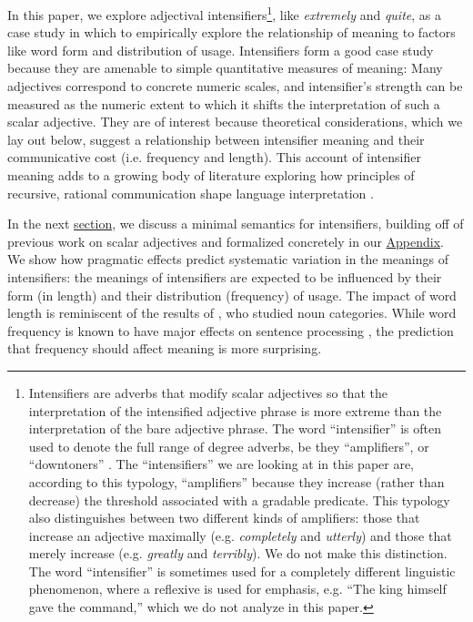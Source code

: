 \documentclass[10pt,letterpaper]{article}
\newcommand{\w}[1]{\emph{#1}}
\begin{document}
In this paper, we explore adjectival intensifiers\footnote{
Intensifiers are adverbs that modify scalar adjectives so that the interpretation of the intensified adjective phrase is more extreme than the interpretation of the bare adjective phrase.
The word ``intensifier'' is often used to denote the full range of degree adverbs, be they ``amplifiers'', or ``downtoners'' \cite{quirk}.
The ``intensifiers'' we are looking at in this paper are, according to this typology, ``amplifiers'' because they increase (rather than decrease) the threshold associated with a gradable predicate.
This typology also distinguishes between two different kinds of amplifiers: those that increase an adjective maximally (e.g. \w{completely} and \w{utterly}) and those that merely increase (e.g. \w{greatly} and \w{terribly}).
We do not make this distinction.
The word ``intensifier'' is sometimes used for a completely different linguistic phenomenon, where a reflexive is used for emphasis, e.g. ``The king himself gave the command,'' which we do not analyze in this paper. 
},
like \w{extremely} and \w{quite}, as a case study in which to empirically explore the relationship of meaning to factors like word form and distribution of usage.
Intensifiers form a good case study because they are amenable to simple quantitative measures of meaning: Many adjectives correspond to concrete numeric scales, and intensifier's strength can be measured as the numeric extent to which it shifts the interpretation of such a scalar adjective. They are of interest because theoretical considerations, which we lay out below, suggest a relationship between intensifier meaning and their communicative cost (i.e. frequency and length).
This account of intensifier meaning adds to a growing body of literature exploring how principles of recursive, rational communication shape language interpretation \cite[e.g.]{grice_logic_1975, frank_predicting_2012, goodman_knowledge_2013, franke_quantity_2011, russell_probabilistic_2012, kao_nonliteral_2014, bergen_pragmatic_2014}.

In the next \hyperref[sec:semantics]{section}, we discuss a minimal semantics for intensifiers, building off of previous work on scalar adjectives and formalized concretely in our \hyperref[app:model]{Appendix}.
We show how pragmatic effects predict systematic variation in the meanings of intensifiers: the meanings of intensifiers are expected to be influenced by their form (in length) and their distribution (frequency) of usage.
The impact of word length is reminiscent of the results of , who studied noun categories.
While word frequency is known to have major effects on sentence processing \cite[e.g.]{levy_expectation-based_2008}, the prediction that frequency should affect meaning is more surprising.
\end{document}
